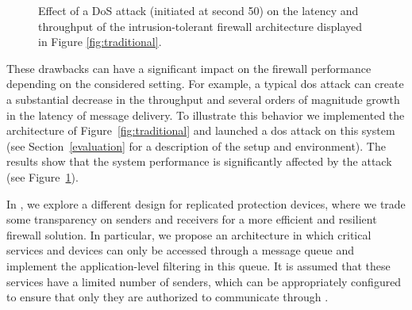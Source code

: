 \begin{figure}[h]
\begin{center}
\hspace{-5mm}
\caption{Effect of a DoS attack (initiated at second 50) on the latency and throughput of the intrusion-tolerant firewall architecture displayed in Figure \ref{fig:traditional}.}
\label{fig:attack_traditional}
\end{center}
\end{figure}

These drawbacks can have a significant impact on the firewall performance depending on the considered setting. 
For example, a typical \gls{dos} attack can create a substantial decrease in the throughput and several orders of magnitude growth in the latency of message delivery. 
To illustrate this behavior we implemented the architecture of Figure~\ref{fig:traditional} and launched a \gls{dos} attack on this system (see Section~\ref{evaluation} for a description of the setup and environment). 
The results show that the system performance is significantly affected by the attack (see Figure~\ref{fig:attack_traditional}).




In \sieveq, we explore a different design for replicated protection devices, where we trade some transparency on senders and receivers for a more efficient and resilient firewall solution.
In particular, we propose an architecture in which critical services and devices can only be accessed through a message queue and implement the application-level filtering in this queue.
It is assumed that these services have a limited number of senders, which can be appropriately configured to ensure that only they are authorized to communicate through \sieveq.

